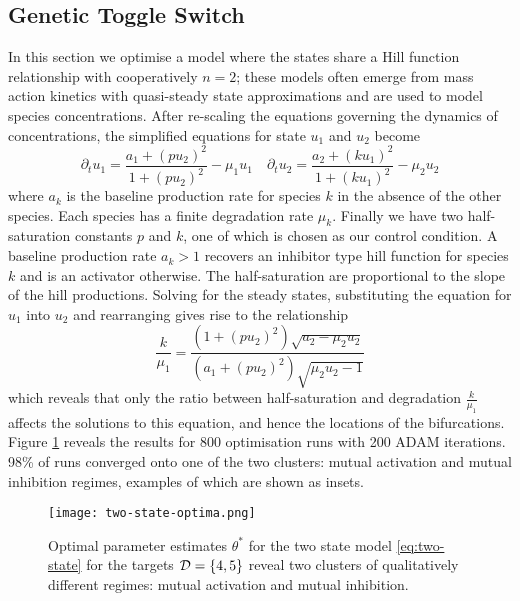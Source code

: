 \subsection{Genetic Toggle Switch}
In this section we optimise a model where the states share a Hill function relationship with cooperatively $n=2$; these models often emerge from mass action kinetics with quasi-steady state approximations and are used to model species concentrations. After re-scaling the equations governing the dynamics of concentrations, the simplified equations for state $u_1$ and $u_2$ become 
\begin{equation}
    \partial_t u_1 = \frac{ a_1 + (p u_2)^2}{ 1 + (p u_2)^2 } - \mu_1 u_1 \quad
    \partial_t u_2 = \frac{ a_2 + (k u_1)^2}{ 1 + (k u_1)^2 } - \mu_2 u_2
    \label{eq:two-state}
\end{equation}
where $a_k$ is the baseline production rate for species $k$ in the absence of the other species. Each species has a finite degradation rate $\mu_k$. Finally we have two half-saturation constants $p$ and $k$, one of which is chosen as our control condition. A baseline production rate $a_k>1$ recovers an inhibitor type hill function for species $k$ and is an activator otherwise. The half-saturation are proportional to the slope of the hill productions. Solving for the steady states,  substituting the equation for $u_1$ into $u_2$ and rearranging gives rise to the relationship
\begin{equation}
    \dfrac{k}{\mu_1} = \dfrac{(1 + (p u_2)^2) \sqrt{a_2 - \mu_2 u_2} }{ (a_1 + (p u_2)^2) \sqrt{ \mu_2 u_2 - 1 } }
    \label{eq:steady-states}
\end{equation}
which reveals that only the ratio between half-saturation and degradation $\frac{k}{\mu_1}$ affects the solutions to this equation, and hence the locations of the bifurcations. Figure \ref{fig:two-state-optima} reveals the results for 800 optimisation runs with 200 ADAM iterations. 98\% of runs converged onto one of the two clusters: mutual activation and mutual inhibition regimes, examples of which are shown as insets.
\begin{figure}
\centering
\texttt{[image: two-state-optima.png]}
\caption{Optimal parameter estimates $\theta^*$ for the two state model \eqref{eq:two-state} for the targets $\mathcal{D}=\{4,5\}$ reveal two clusters of qualitatively different regimes: mutual activation and mutual inhibition. }
\label{fig:two-state-optima}
\end{figure}

